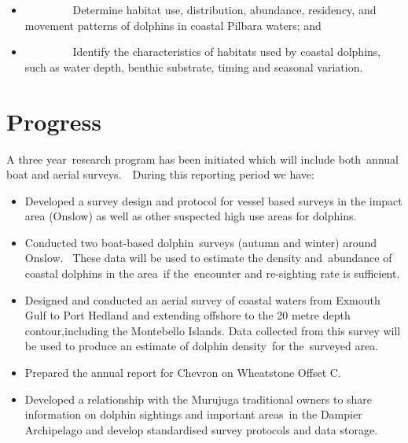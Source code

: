 \documentclass[version=last,
    paper=a4, %
    10pt, %
    usenames,
    dvipsnames,
    oneside, %
    headings=openany, %
    DIV=15 %
]{scrbook}
\begin{document}
\begin{itemize}
\itemsep1pt\parskip0pt
\item
  ~~~~~~~~ Determine habitat use, distribution, abundance, residency,
  and movement patterns of dolphins in coastal Pilbara waters; and
\item
  ~~~~~~~~ Identify the characteristics of habitats used by coastal
  dolphins, such as water depth, benthic substrate, timing and seasonal
  variation.~
\end{itemize}



\section*{Progress}
A three year~research program has been initiated which will include
both~annual boat and aerial surveys.~~During this reporting period we
have:

\begin{itemize}
\itemsep1pt\parskip0pt
\item
  Developed a survey design and protocol for vessel based surveys in the
  impact area (Onslow) as well as other suspected high use areas for
  dolphins.
\item
  Conducted two boat-based dolphin~surveys (autumn and winter) around
  Onslow.~ These data will be used to estimate the density and~abundance
  of coastal dolphins in the area~if the~encounter and re-sighting rate
  is sufficient.
\item
  Designed and conducted an aerial survey of coastal waters from Exmouth
  Gulf to Port Hedland and extending offshore to the 20 metre depth
  contour,including the Montebello Islands. Data collected from this
  survey will be used to produce an estimate of dolphin density~for
  the~surveyed area.
\item
  Prepared the annual report for Chevron on Wheatstone Offset C.
\item
  Developed a relationship with the Murujuga traditional owners to share
  information on dolphin sightings and important areas~in the Dampier
  Archipelago and develop standardised survey protocols and data
  storage.
\end{itemize}
\end{document}
